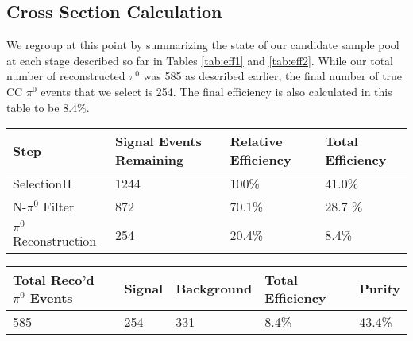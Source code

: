 \documentclass[12pt]{article}
\begin{document}
\subsection{Cross Section Calculation}

We regroup at this point by summarizing the state of our candidate sample pool at each stage described so far in Tables \ref{tab:eff1} and \ref{tab:eff2}. While our total number of reconstructed $\pi^0$ was 585 as described earlier, the final number of true CC $\pi^0$ events that we select is 254. The final efficiency is also calculated in this table to be 8.4\%.  

\begin{minipage}{\linewidth}
\centering
{} \label{tab:eff1} 
 \begin{tabular}{| l | l | l | l |}
 \hline
 Step & Signal Events Remaining & Relative Efficiency & Total Efficiency \\ [0.5ex]
 \hline\hline

\hline
  SelectionII & 1244 & 100\% & 41.0\% \\ 
\hline
  N-$\pi^0$ Filter & 872 & 70.1\% & 28.7 \% \\ \hline
  $\pi^0$ Reconstruction & 254 & 20.4\% & 8.4\% \\ \hline
   \end{tabular}
\end{minipage}

\begin{minipage}{\linewidth}
\centering
{} \label{tab:eff2} 
 \begin{tabular}{| l | l | l | l | l |}
 \hline
 Total Reco'd $\pi^0$ Events & Signal & Background & Total Efficiency & Purity \\ [0.5ex]
 \hline\hline
\hline
  585 & 254 & 331 & 8.4\% & 43.4\% \\ 
\hline 
   \end{tabular}
\end{minipage}
\end{document}
